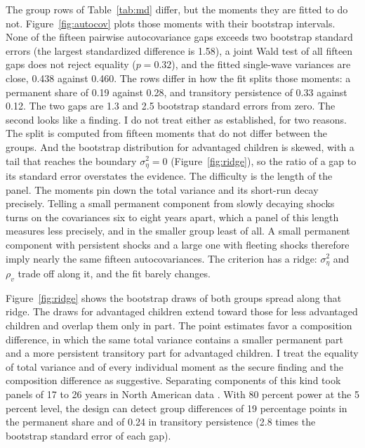 \documentclass[11pt]{article}
\begin{document}
The group rows of Table~\ref{tab:md} differ, but the moments they are fitted to do not. Figure~\ref{fig:autocov} plots those moments with their bootstrap intervals. None of the fifteen pairwise autocovariance gaps exceeds two bootstrap standard errors (the largest standardized difference is 1.58), a joint Wald test of all fifteen gaps does not reject equality ($p = 0.32$), and the fitted single-wave variances are close, 0.438 against 0.460. The rows differ in how the fit splits those moments: a permanent share of 0.19 against 0.28, and transitory persistence of 0.33 against 0.12. The two gaps are 1.3 and 2.5 bootstrap standard errors from zero. The second looks like a finding. I do not treat either as
established, for two reasons. The split is computed from fifteen moments that do not differ between the groups. And the
bootstrap distribution for advantaged children is skewed, with a tail
that reaches the boundary $\sigma^2_\eta = 0$
(Figure~\ref{fig:ridge}), so the ratio of a gap to its standard error
overstates the evidence. The difficulty is the length of the panel. The moments pin down the total variance and its short-run decay precisely. Telling a small permanent component from slowly decaying shocks turns on the covariances six to eight years apart, which a panel of this length measures less precisely, and in the smaller group least of all. A small permanent component with persistent shocks and a large one with fleeting shocks therefore imply nearly the same fifteen autocovariances. The criterion has a ridge: $\sigma^2_\eta$ and $\rho_v$ trade off along it, and the fit barely changes.

Figure~\ref{fig:ridge} shows the bootstrap draws of both groups spread
along that ridge. The draws for advantaged children extend toward those
for less advantaged children and overlap them only in part. The point estimates favor a composition difference, in which the same total variance contains a
smaller permanent part and a more persistent transitory part for
advantaged children. I treat the
equality of total variance and of every individual moment as the secure
finding and the composition difference as suggestive. Separating components of this kind took panels of 17 to 26 years in North American data \citep{BakerSolon2003, Guvenen2009}. With 80 percent power at the 5 percent level, the design can detect group differences of 19 percentage points in the permanent share and of 0.24 in transitory persistence (2.8 times the bootstrap standard error of each
gap).
\end{document}
